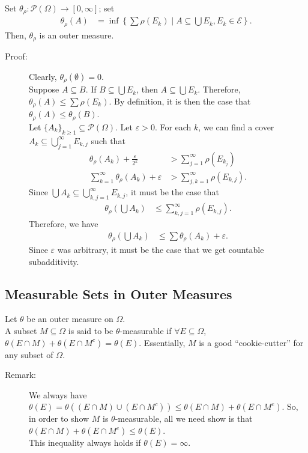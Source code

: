 \documentclass[9pt]{extarticle}
\begin{document}
  Set $\theta_{\rho}: \mathcal{P}(\Omega) \rightarrow [0,\infty]$; set
  \begin{align*}
    \theta_{\rho}(A) &= \inf \left\{\sum \rho(E_k)\mid A\subseteq \bigcup E_k,E_k\in \mathcal{E}\right\}.
  \end{align*}
  Then, $\theta_{\rho}$ is an outer measure.
  \begin{description}
    \item[Proof:] Clearly, $\theta_{\rho}(\emptyset) = 0$.\\

      Suppose $A\subseteq B$. If $B\subseteq \bigcup E_k$, then $A\subseteq \bigcup E_k$. Therefore, $\theta_{\rho}(A)\leq \sum \rho(E_k)$. By definition, it is then the case that $\theta_{\rho}(A)\leq \theta_{\rho}(B)$.\\

      Let $\{A_k\}_{k\geq 1}\subseteq \mathcal{P}(\Omega)$. Let $\varepsilon > 0$. For each $k$, we can find a cover $A_k\subseteq \bigcup_{j=1}^{\infty} E_{k,j}$ such that
      \begin{align*}
        \theta_{\rho}(A_k) + \frac{\varepsilon}{2^k} &> \sum_{j=1}^{\infty}\rho(E_{k_j})\\
        \sum_{k=1}^{\infty}\theta_{\rho}(A_k) + \varepsilon &> \sum_{j,k=1}^{\infty}\rho(E_{k,j}).
      \end{align*}
      Since $\bigcup A_k \subseteq \bigcup_{k,j=1}^{\infty}E_{k,j}$, it must be the case that
      \begin{align*}
        \theta_{\rho}\left(\bigcup A_k\right) &\leq \sum_{k,j=1}^{\infty}\rho(E_{k,j}).
      \end{align*}
      Therefore, we have
      \begin{align*}
        \theta_{\rho}\left(\bigcup A_k\right) &\leq \sum \theta_{\rho}(A_k) + \varepsilon.
      \end{align*}
      Since $\varepsilon$ was arbitrary, it must be the case that we get countable subadditivity.
  \end{description}
  \subsection{Measurable Sets in Outer Measures}%
  Let $\theta$ be an outer measure on $\Omega$.\\

  A subset $M\subseteq \Omega$ is said to be $\theta$-measurable if $\forall E\subseteq \Omega$, $\theta(E\cap M) + \theta(E\cap M^{c}) = \theta(E)$. Essentially, $M$ is a good ``cookie-cutter'' for any subset of $\Omega$.
  \begin{description}
    \item[Remark:] We always have $\theta(E) = \theta\left((E\cap M)\cup (E\cap M^{c})\right) \leq \theta(E\cap M) + \theta(E\cap M^{c})$. So, in order to show $M$ is $\theta$-measurable, all we need show is that $\theta(E\cap M) + \theta(E\cap M^{c}) \leq \theta(E)$.\\

      This inequality always holds if $\theta(E) = \infty$.
  \end{description}
\end{document}

